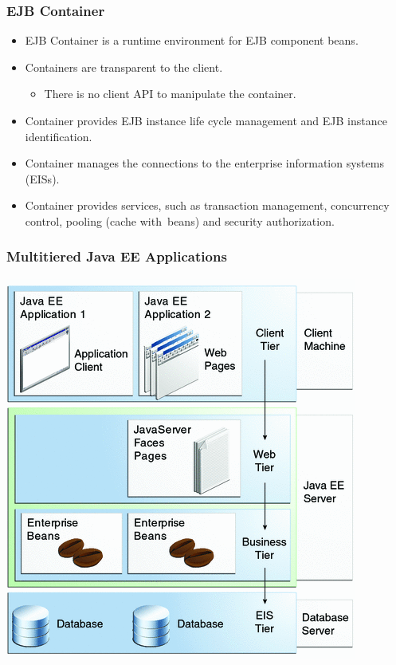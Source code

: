 \documentclass[10pt,xcolor=pdflatex]{beamer}
\begin{document}
\begin{frame}\frametitle{EJB Container}
	\begin{itemize}
		\item EJB Container is a runtime environment for EJB component beans.
		\item Containers are transparent to the client.
          \begin{itemize}
            \item There is no client API to manipulate the container.
          \end{itemize}
		\item Container provides EJB instance life cycle management and EJB instance identification.
		\item Container manages the connections to the enterprise information systems (EISs). %
		\item Container provides services, such as transaction management, concurrency control, pooling (cache with~beans) and security authorization.
	\end{itemize}
\end{frame}


\begin{frame}\frametitle{Multitiered Java EE Applications}
\begin{center}
  \includegraphics[scale=0.49]{img/overview-multitieredapps}
\end{center}
\end{frame}
\end{document}
